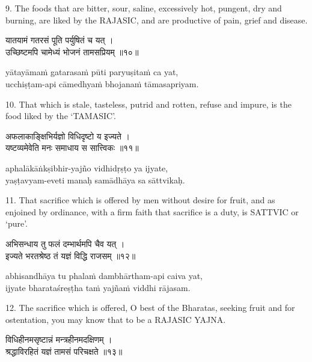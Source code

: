 9. The foods that are bitter, sour, saline, excessively hot, pungent, dry and
burning, are liked by the RAJASIC, and are productive of pain, grief and
disease.

\begin{gitaverse}
यातयामं गतरसं पूति पर्युषितं च यत् । \\
उच्छिष्टमपि चामेध्यं भोजनं तामसप्रियम् ॥१०॥
\end{gitaverse}

\begin{transliteration}
yātayāmaṁ gatarasaṁ pūti paryuṣitaṁ ca yat, \\
ucchiṣṭam-api cāmedhyaṁ bhojanaṁ tāmasapriyam.
\end{transliteration}

10. That which is stale, tasteless, putrid and rotten, refuse and impure, is
the food liked by the `TAMASIC'.

\begin{gitaverse}
अफलाकाङ्क्षिभिर्यज्ञो विधिदृष्टो य इज्यते । \\
यष्टव्यमेवेति मनः समाधाय स सात्त्विकः ॥११॥
\end{gitaverse}

\begin{transliteration}
aphalākāṅkṣibhir-yajño vidhidṛṣṭo ya ijyate, \\
yaṣṭavyam-eveti manaḥ samādhāya sa sāttvikaḥ.
\end{transliteration}

11. That sacrifice which is offered by men without desire for fruit, and as
enjoined by ordinance, with a firm faith that sacrifice is a duty, is SATTVIC
or `pure'.

\begin{gitaverse}
अभिसन्धाय तु फलं दम्भार्थमपि चैव यत् । \\
इज्यते भरतश्रेष्ठ तं यज्ञं विद्धि राजसम् ॥१२॥
\end{gitaverse}

\begin{transliteration}
abhisandhāya tu phalaṁ dambhārtham-api caiva yat, \\
ijyate bharataśreṣṭha taṁ yajñaṁ viddhi rājasam.
\end{transliteration}

12. The sacrifice which is offered, O best of the Bharatas, seeking fruit and
for ostentation, you may know that to be a RAJASIC YAJNA.\@

\begin{gitaverse}
विधिहीनमसृष्टान्नं मन्त्रहीनमदक्षिणम् । \\
श्रद्धाविरहितं यज्ञं तामसं परिचक्षते ॥१३॥
\end{gitaverse}

